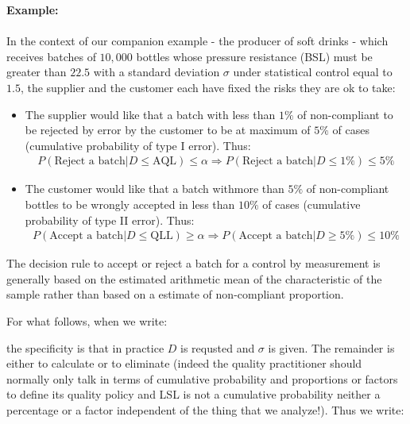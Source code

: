 	\begin{tcolorbox}[colframe=black,colback=white,sharp corners]
	\textbf{{\Large {}}Example:}\\\\
	In the context of our companion example - the producer of soft drinks - which receives batches of $10,000$ bottles whose pressure resistance (BSL) must be greater than $22.5$ with a standard deviation $\sigma$ under statistical control equal to $1.5$, the supplier and the customer each have fixed the risks they are ok to take:
	\begin{itemize}
		\item The supplier would like that a batch with less than $1\%$ of non-compliant to be rejected by error by the customer to be at maximum of $5\%$ of cases (cumulative probability of type I error). Thus:
		\begin{gather*}
			P(\text{Reject a batch}|D\leq \text{AQL})\leq \alpha\Rightarrow  P(\text{Reject a batch}|D\leq 1\%)\leq 5\%
		\end{gather*}

		\item The customer would like that a batch withmore than $5\%$ of non-compliant bottles to be wrongly accepted in less than $10\%$ of cases (cumulative probability of type II error). Thus:
		\begin{gather*}
			P(\text{Accept a batch}|D\leq \text{QLL})\geq \alpha\Rightarrow  P(\text{Accept a batch}|D\geq 5\%)\leq 10\%
		\end{gather*}
	\end{itemize}
	\end{tcolorbox}
	\begin{tcolorbox}[title=Remark,colframe=black,arc=10pt]
	The decision rule to accept or reject a batch for a control by measurement is generally based on the estimated arithmetic mean of the characteristic of the sample rather than based on a estimate of non-compliant proportion.
	\end{tcolorbox}
	For what follows, when we write:
	
	the specificity is that in practice $D$ is requsted and $\sigma$ is given. The remainder is either to calculate or to eliminate (indeed the quality practitioner should normally only talk in terms of cumulative probability and proportions or factors  to define its quality policy and LSL is not a cumulative probability neither a percentage or a factor independent of the thing that we analyze!). Thus we write:
	
